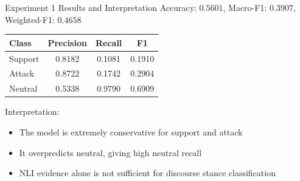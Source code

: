 \documentclass[aspectratio=169]{beamer}
\begin{document}
\begin{frame}{Experiment 1 Results and Interpretation}
Accuracy: \(0.5601\), Macro-F1: \(0.3907\), Weighted-F1: \(0.4658\)

\vspace{0.3cm}
\centering
\begin{tabular}{lccc}
\toprule
Class & Precision & Recall & F1 \\
\midrule
Support & 0.8182 & 0.1081 & 0.1910 \\
Attack & 0.8722 & 0.1742 & 0.2904 \\
Neutral & 0.5338 & 0.9790 & 0.6909 \\
\bottomrule
\end{tabular}

\vspace{0.4cm}
Interpretation:
\begin{itemize}
  \item The model is extremely conservative for support and attack
  \item It overpredicts neutral, giving high neutral recall
  \item NLI evidence alone is not sufficient for discourse stance classification
\end{itemize}
\end{frame}
\end{document}
